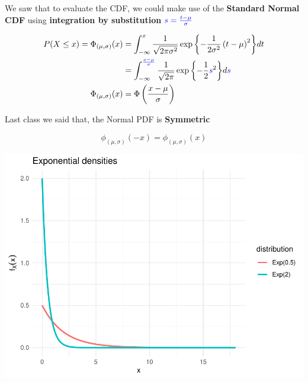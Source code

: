 \documentclass[smaller]{beamer}\usepackage[]{graphicx}\usepackage[]{color}
\newenvironment{knitrout}{}{} %
\begin{document}
\begin{frame}{\secname}
We saw that to evaluate the CDF, we could make use of the \textbf{Standard Normal CDF}
using \textbf{integration by substitution} $\color{blue}{s = \frac{t-\mu}{\sigma}}$

\begin{align*}
P(X \leq x) =
\Phi_{(\mu,\sigma)}(x)
&=
\int_{-\infty}^{x} \frac{1}{\sqrt{2\pi \sigma ^{2}}}\exp{\left\{-\frac{1}{2\sigma ^{2}}\left(t-\mu \right) ^{2}\right\}}dt\\
&=
\int_{-\infty}^{{\color{blue}{\frac{x-\mu}{\sigma}}}}\frac{1}{\sqrt{2\pi}}\exp{\left\{ -\frac{1
  }{2}{\color{blue}{s}}^{2}\right\}}d{\color{blue}{s}}\\
\Phi_{(\mu,\sigma)}(x)  &= \Phi\left(\frac{x-\mu}{\sigma}\right)
\end{align*}

\end{frame}


\begin{frame}{\secname}

  Last class we said that, the Normal PDF is \textbf{Symmetric}

  $$\phi_{(\mu,\sigma)}(-x) = \phi_{(\mu,\sigma)}(x)$$

\begin{knitrout}
\color{fgcolor}

{\centering \includegraphics[width=0.5\linewidth]{figure/unnamed-chunk-2-1} 

}



\end{knitrout}

\end{frame}
\end{document}

